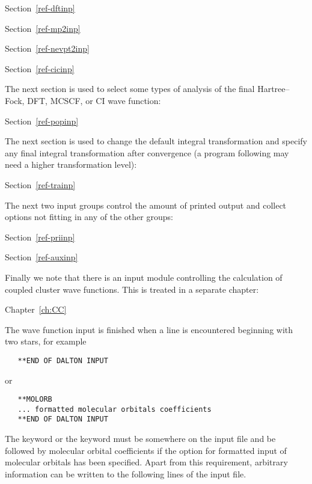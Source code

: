 Section~\ref{ref-dftinp} 

Section~\ref{ref-mp2inp} 

Section~\ref{ref-nevpt2inp} 

Section~\ref{ref-cicinp} 

\noindent
The next section is used to select some types of analysis of the final
Hartree--Fock, DFT, MCSCF, or CI wave function:

Section~\ref{ref-popinp} 

\noindent
The next section is used to change the default integral transformation
and specify any final integral transformation after convergence (a
program following {\sir} may need a higher transformation level):

Section~\ref{ref-trainp} 

\noindent
The next two input groups control the amount of printed output and
collect options not fitting in any of the other groups:

Section~\ref{ref-priinp} 

Section~\ref{ref-auxinp} 

\noindent
Finally we note that there is an input module controlling the
calculation of coupled cluster wave functions. This is treated in a
separate chapter:

Chapter~\ref{ch:CC} 

\bigskip
\noindent
The wave function input is finished when a line is encountered beginning
with two stars, for example

\begin{inputex} \begin{verbatim}
   **END OF DALTON INPUT
\end{verbatim} \end{inputex}
or

\begin{inputex} \begin{verbatim}
   **MOLORB
   ... formatted molecular orbitals coefficients
   **END OF DALTON INPUT
\end{verbatim} \end{inputex}

\noindent
The  keyword or the  keyword
must be somewhere on the input file and be
followed by molecular orbital coefficients if the option for formatted
input of molecular orbitals has been specified.  Apart from this
requirement, arbitrary information can be written to the following lines
of the input file.



